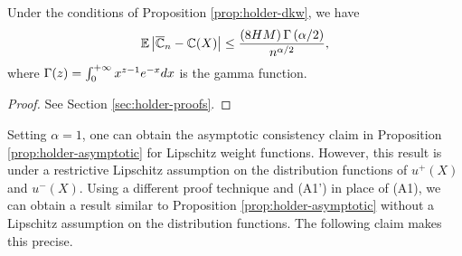 \begin{corollary}
\label{cor:holder-dkw}
Under the conditions of Proposition \ref{prop:holder-dkw}, we have
$$
\mathbb{E} \left|\overline {\mathbb{C}}_n- \mathbb{C}(X) \right|  \le    \frac{\left(8HM\right) \Gamma\left(\alpha/2\right)}{n^{\alpha/2}},$$
where $\Gamma(z)=\int_0^{+\infty} x^{z-1} e^{-x} dx$ is the gamma function.
\end{corollary}

\begin{proof}
%
%
See Section \ref{sec:holder-proofs}.
\end{proof}


Setting $\alpha=1$, one can obtain the asymptotic consistency claim in Proposition \ref{prop:holder-asymptotic} for Lipschitz weight functions. However, this result is under  a restrictive Lipschitz assumption on the distribution functions of $u^+(X)$ and $u^-(X)$. Using a different proof technique and (A1') in place of (A1), we can obtain a result similar to Proposition \ref{prop:holder-asymptotic} without a Lipschitz assumption on the distribution functions. The following claim makes this precise.

